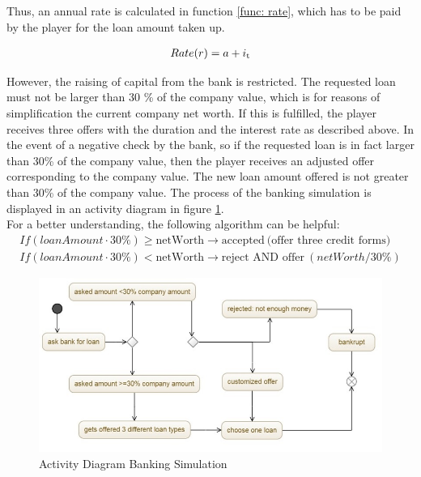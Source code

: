 Thus, an annual rate is calculated in function \ref{func: rate}, which has to be paid by the player for the loan amount taken up.

\begin{equation}
\label{func: rate}
\begin{aligned}
Rate (r)= a+ i\textsubscript{t}
\end{aligned}    
\end{equation}


However, the raising of capital from the bank is restricted.
The requested loan must not be larger than 30 \% of the company value, which is for reasons of simplification the current company net worth. If this is fulfilled, the player receives three offers with the duration and the interest rate as described above. In the event of a negative check by the bank, so if the requested loan is in fact larger than 30\% of the company value, then the player receives an adjusted offer corresponding to the company value. The new loan amount offered is not greater than 30\% of the company value. The process of the banking simulation is displayed in an activity diagram in figure \ref{jpg:banking}.\\
For a better understanding, the following algorithm can be helpful:
\begin{equation}
\begin{aligned}
If (loanAmount \cdot 30\% ) \geq  \text{netWorth} \xrightarrow{} \text{accepted} \ \text{(offer three credit forms)} \\
If (loanAmount \cdot 30\%) < \text{netWorth} \xrightarrow{} \text{reject AND offer} \ (netWorth / 30\%)
\end{aligned}    
\end{equation}

\begin{figure}
	\centering
	\includegraphics[width=12cm]{images/banking_activity_diagram.jpg}
	\caption{Activity Diagram Banking Simulation}
	\label{jpg:banking}
\end{figure}

